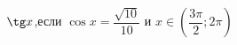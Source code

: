 \begin{ex}[type=calculate_expression]
	\begin{condition}
		\( \tg x \),\quad если \( \cos x=\dfrac{\sqrt{10}}{10} \) и \( x\in\left( \dfrac{3\pi}{2};2\pi \right) \)
	\end{condition}
\end{ex}